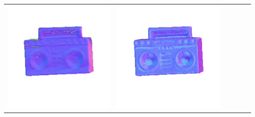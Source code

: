 \begin{tabularx}{\linewidth}{@{}Y@{}Y@{}Y@{}Y@{}Y@{}Y@{}}
\includegraphics[width=\linewidth]{semisynthetic/20150514_19_yu_out.png} &
\includegraphics[width=\linewidth]{semisynthetic/20150514_19_dpsn_out.png} &

\end{tabularx}
